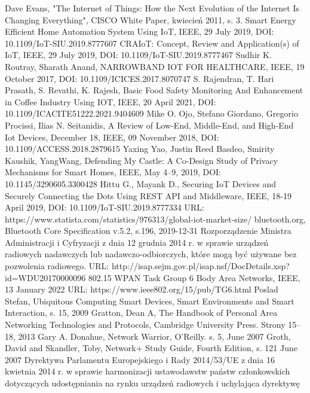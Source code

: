 \documentclass[12pt, twoside, openany]{mwrep}
\begin{document}

\begin{thebibliography}{99}
\bibitem[1]{} Dave Evans, "The Internet of Things: How the Next Evolution of the Internet Is Changing Everything", CISCO White Paper, kwiecień 2011, s. 3.
\bibitem[2]{} Smart Energy Efficient Home Automation System Using IoT, IEEE, 29 July 2019, DOI: 10.1109/IoT-SIU.2019.8777607
\bibitem[3]{} CRAIoT: Concept, Review and Application(s) of IoT, IEEE, 29 July 2019, DOI: 10.1109/IoT-SIU.2019.8777467
\bibitem[4]{} Sudhir K. Routray, Sharath Anand, NARROWBAND IOT FOR HEALTHCARE, IEEE, 19 October 2017, DOI: 10.1109/ICICES.2017.8070747
\bibitem[5]{} S. Rajendran, T. Hari Prasath, S. Revathi, K. Rajesh, Basic Food Safety Monitoring And Enhancement in Coffee Industry Using IOT, IEEE, 20 April 2021, DOI: 10.1109/ICACITE51222.2021.9404609
\bibitem[6]{} Mike O. Ojo, Stefano Giordano, Gregorio Procissi, Ilias N. Seitanidis, A Review of Low-End, Middle-End, and High-End Iot Devices, December 18, IEEE, 09 November 2018, DOI: 10.1109/ACCESS.2018.2879615
\bibitem[7]{} Yaxing Yao, Justin Reed Basdeo, Smirity Kaushik, YangWang, Defending My Castle: A Co-Design Study of Privacy Mechanisms for Smart Homes, IEEE, May 4–9, 2019, DOI: 10.1145/3290605.3300428
\bibitem[8]{} Hittu G., Mayank D., Securing IoT Devices and Securely Connecting the Dots Using REST API and Middleware, IEEE, 18-19 April 2019, DOI: 10.1109/IoT-SIU.2019.8777334
\bibitem[9]{} URL: https://www.statista.com/statistics/976313/global-iot-market-size/
\bibitem[10]{} bluetooth.org, Bluetooth Core Specification v.5.2, s.196, 2019-12-31
\bibitem[11]{} Rozporządzenie Ministra Administracji i Cyfryzacji z dnia 12 grudnia 2014 r. w sprawie urządzeń radiowych nadawczych lub nadawczo-odbiorczych, które mogą być używane bez pozwolenia radiowego. URL: http://isap.sejm.gov.pl/isap.nsf/DocDetails.xsp?id=WDU20170000096
\bibitem[12]{} 802.15 WPAN Task Group 6 Body Area Networks, IEEE, 13 January 2022 URL: https://www.ieee802.org/15/pub/TG6.html
\bibitem[13]{} Poslad Stefan, Ubiquitous Computing Smart Devices, Smart Environments and Smart Interaction, s. 15, 2009
\bibitem[14]{} Gratton, Dean A, The Handbook of Personal Area Networking Technologies and Protocols, Cambridge University Press. Strony 15–18, 2013 
\bibitem[15]{} Gary A. Donahue, Network Warrior, O'Reilly. s. 5, June 2007
\bibitem[16]{} Groth, David and Skandler, Toby, Network+ Study Guide, Fourth Edition, s. 121 June 2007
\bibitem[17]{} Dyrektywa Parlamentu Europejskiego i Rady 2014/53/UE z dnia 16 kwietnia 2014 r. w sprawie harmonizacji ustawodawstw państw członkowskich dotyczących udostępniania na rynku urządzeń radiowych i uchylająca dyrektywę

\end{thebibliography}
\end{document}
